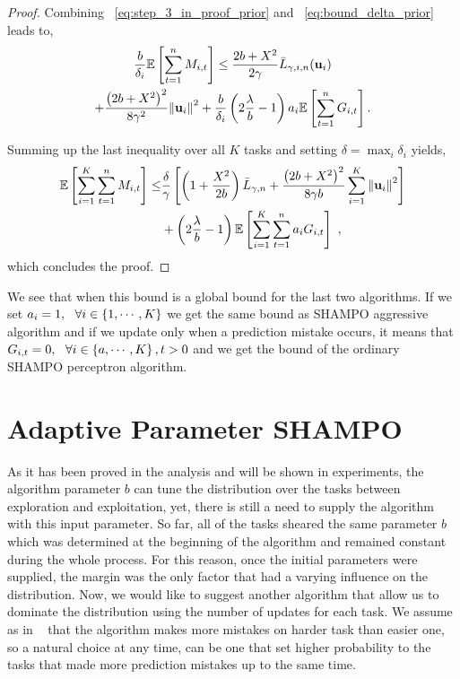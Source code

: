 {\begin{proof}
\noindent
Combining ~\eqref{eq:step_3_in_proof_prior} and ~\eqref{eq:bound_delta_prior} leads to, 
\begin{multline*}
\label{eq:bound_for_i}
\frac{b}{\delta_i}\mathbb{E}\left[ \sum_{t=1}^{n}{M_{i,t}} \right]
\le \frac{2b+X^2}{2\gamma}{\bar L}_{\gamma,i,n}(\mathbf{u}_{i}) 
\\+\frac{\left({2b+X^2}\right)^2}{8{\gamma}^2}{\left\Vert \mathbf{u}_{i} \right\Vert}^2 
+\frac{b}{\delta_i}\left({2\frac{\lambda}{b}-1}\right)a_{i}\mathbb{E}\left[{\sum_{t=1}^{n}{G_{i,t}}}\right].
\end{multline*}

\noindent
Summing up the last inequality over all $K$ tasks and setting $\delta
= \max_i \delta_i$ yields,
\begin{equation*}
\begin{split}
\mathbb{E}\left[ \sum_{i=1}^{K}\sum_{t=1}^{n}{M_{i,t}} \right]
\le&\frac{\delta}{\gamma }\left[{\left(1+\frac{X^2}{2b} \right){\bar L}_{\gamma,n}+
\frac{\left({2b+X^2}\right)^2}{8{\gamma}b}\sum_{i=1}^{K}{{\left\Vert \mathbf{u}_{i} \right\Vert}^2}}\right]\\ 
&+
\left({2\frac{\lambda}{b}-1}\right)\mathbb{E}\left[{\sum_{i=1}^{K}\sum_{t=1}^{n}{a_{i}G_{i,t}}}\right]~,
\end{split}
\end{equation*}
which concludes the proof.
\QED
\end{proof}

\noindent
We see that when this  bound is a global bound for the last two algorithms. 
If we set $a_i=1, ~~\forall i\in\left\{{1,\cdots,K}\right\}$ we get the same bound as  SHAMPO aggressive 
algorithm and if we update only when a prediction mistake occurs, it means that 
$G_{i,t}=0,~~\forall i\in\left\{{a,\cdots,K}\right\},t>0$ and we get the bound of  the ordinary 
SHAMPO perceptron algorithm.


\section{Adaptive Parameter SHAMPO}

As it has been proved in the analysis and will be shown in experiments, the algorithm parameter $b$ can tune 
the distribution over the tasks between exploration and exploitation, yet, there is still a need to supply 
the algorithm with this input parameter. So far, all of the tasks sheared the same parameter $b$ which
was determined at the beginning of the algorithm and remained constant during the whole process. 
For this reason, once the initial parameters were supplied, the margin was the only factor that had a varying
influence on the distribution. Now, we would like to suggest another algorithm that allow us to
dominate the distribution using the number of updates for each task. 
We assume as in ~\cite{cesa2006worst} that the algorithm makes more mistakes on harder task than easier one, so a natural choice 
at any time, can be one that set higher probability to the tasks that made more prediction mistakes up to 
the same time. 

}
